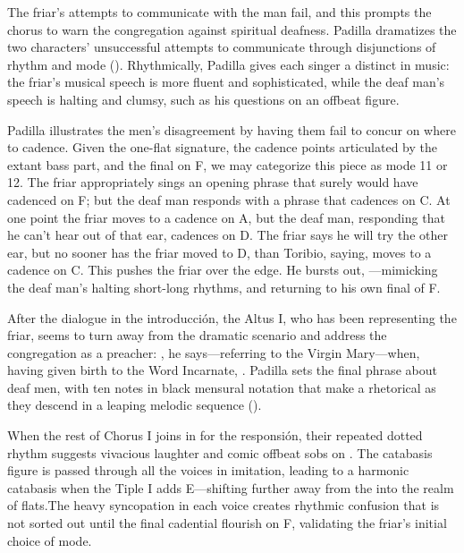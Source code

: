 The friar's attempts to communicate with the  man fail, and this prompts the chorus to warn the congregation against spiritual deafness.
Padilla dramatizes the two characters' unsuccessful attempts to communicate through disjunctions of rhythm and mode ().
Rhythmically, Padilla gives each singer a distinct  in music: the friar's musical speech is more fluent and sophisticated, while the deaf man's speech is halting and clumsy, such as his questions  on an offbeat figure.


Padilla illustrates the men's disagreement by having them fail to concur on where to cadence.
Given the one-flat  signature, the cadence points articulated by the extant bass part, and the final on F, we may categorize this piece as mode 11 or 12.
The friar appropriately sings an opening phrase that surely would have cadenced on F; but the deaf man responds with a phrase that cadences on C.
At one point the friar moves to a cadence on A, but the deaf man, responding that he can't hear out of that ear, cadences on D.
The friar says he will try the other ear, but no sooner has the friar moved to D, than Toribio, saying,  moves to a cadence on C.
This pushes the friar over the edge.
He bursts out, ---mimicking the deaf man's halting short-long rhythms, and returning to his own final of F.

After the dialogue in the introducción, the Altus I, who has been representing the friar, seems to turn away from the dramatic scenario and address the congregation as a preacher: , he says---referring to the Virgin Mary---when, having given birth to the Word Incarnate, .
Padilla sets the final phrase about deaf men, with ten notes in black mensural notation that make a rhetorical  as they descend in a leaping melodic sequence ().

When the rest of Chorus I joins in for the responsión, their repeated dotted rhythm suggests vivacious laughter and comic offbeat sobs on .
The catabasis figure is passed through all the voices in imitation, leading to a harmonic catabasis when the Tiple I adds E\fl{}---shifting further away from the  into the  realm of flats.\citXXX[chafe?]
The heavy syncopation in each voice creates rhythmic confusion that is not sorted out until the final cadential flourish on F, validating the friar's initial choice of mode.

